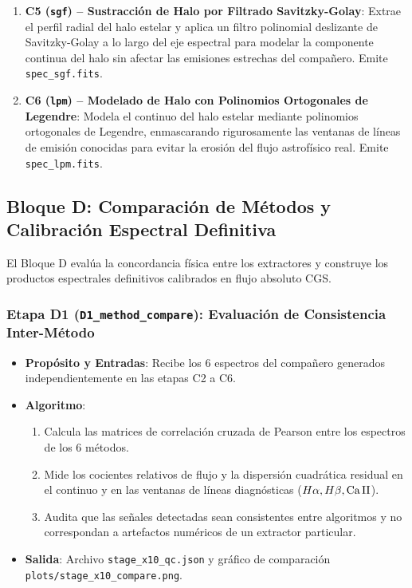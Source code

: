 \documentclass[11pt,a4paper]{article}
\begin{document}
\begin{enumerate}[leftmargin=1.0cm]
    Desacopla de forma analítica exacta el espectro del compañero $b(\lambda)$ y el espectro estelar de la primaria $a(\lambda)$, calculando simultáneamente la matriz de covarianza analítica completa $\mathbf{C} = (\mathbf{X}^T \mathbf{W} \mathbf{X})^{-1}$ y el coeficiente de correlación cruzada $\rho(a, b)$. Emite \texttt{spec\_psffit.fits} y \texttt{spec\_psffit\_star.fits}.
    \item \textbf{C5 (\texttt{sgf}) -- Sustracción de Halo por Filtrado Savitzky-Golay}:
    Extrae el perfil radial del halo estelar y aplica un filtro polinomial deslizante de Savitzky-Golay a lo largo del eje espectral para modelar la componente continua del halo sin afectar las emisiones estrechas del compañero. Emite \texttt{spec\_sgf.fits}.
    \item \textbf{C6 (\texttt{lpm}) -- Modelado de Halo con Polinomios Ortogonales de Legendre}:
    Modela el continuo del halo estelar mediante polinomios ortogonales de Legendre, enmascarando rigurosamente las ventanas de líneas de emisión conocidas para evitar la erosión del flujo astrofísico real. Emite \texttt{spec\_lpm.fits}.
\end{enumerate}

\subsection{Bloque D: Comparación de Métodos y Calibración Espectral Definitiva}

El Bloque D evalúa la concordancia física entre los extractores y construye los productos espectrales definitivos calibrados en flujo absoluto CGS.

\subsubsection{Etapa D1 (\texttt{D1\_method\_compare}): Evaluación de Consistencia Inter-Método}
\begin{itemize}[leftmargin=1.0cm]
    \item \textbf{Propósito y Entradas}: Recibe los 6 espectros del compañero generados independientemente en las etapas C2 a C6.
    \item \textbf{Algoritmo}:
    \begin{enumerate}
        \item Calcula las matrices de correlación cruzada de Pearson entre los espectros de los 6 métodos.
        \item Mide los cocientes relativos de flujo y la dispersión cuadrática residual en el continuo y en las ventanas de líneas diagnósticas ($H\alpha, H\beta, \text{Ca\,II}$).
        \item Audita que las señales detectadas sean consistentes entre algoritmos y no correspondan a artefactos numéricos de un extractor particular.
    \end{enumerate}
    \item \textbf{Salida}: Archivo \texttt{stage\_x10\_qc.json} y gráfico de comparación \texttt{plots/stage\_x10\_compare.png}.
\end{itemize}
\end{document}
